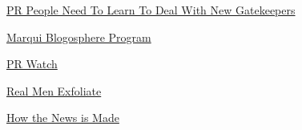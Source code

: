               
            
            
              
            
            
              
                
              
              
              
                \href{http://customers.mediamap.com/articles\_5\_q2.asp}{PR People Need To Learn To Deal With New Gatekeepers}


              
            
            
              
            
            
              
                
              
              
              
                \href{http://www.marqui.com/Paybloggers/}{Marqui Blogosphere Program}


              
            
            
              
            
            
              
                
              
              
              
                \href{http://www.prwatch.org/}{PR Watch}


              
            
            
              
            
            
              
                
              
              
              
                \href{http://www.boston.com/business/articles/2005/04/19/real\_men\_exfoliate/}{Real Men Exfoliate}


              
            
            
              
            
            
              
                
              
              
              
                \href{http://www.boingboing.net/fakenews.html}{How the News is Made}


